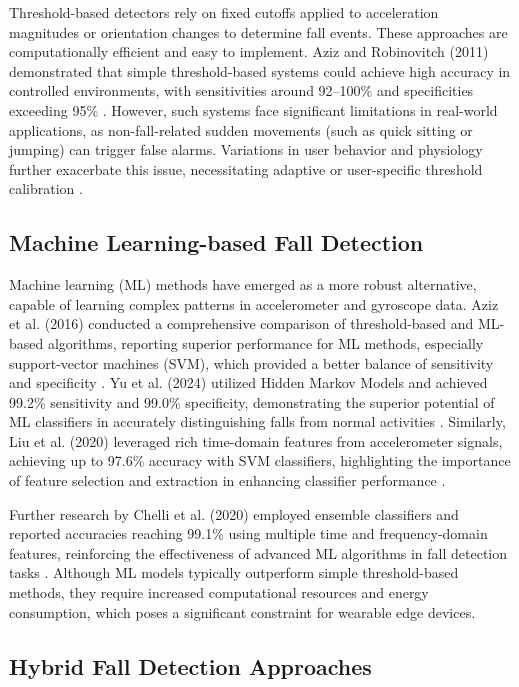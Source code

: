 \documentclass[conference]{IEEEtran}
\begin{document}
Threshold-based detectors rely on fixed cutoffs applied to acceleration magnitudes or orientation changes to determine fall events. These approaches are computationally efficient and easy to implement. Aziz and Robinovitch (2011) demonstrated that simple threshold-based systems could achieve high accuracy in controlled environments, with sensitivities around 92–100\% and specificities exceeding 95\% \cite{3}. However, such systems face significant limitations in real-world applications, as non-fall-related sudden movements (such as quick sitting or jumping) can trigger false alarms. Variations in user behavior and physiology further exacerbate this issue, necessitating adaptive or user-specific threshold calibration \cite{3,6}.

\subsection{Machine Learning-based Fall Detection}

Machine learning (ML) methods have emerged as a more robust alternative, capable of learning complex patterns in accelerometer and gyroscope data. Aziz et al. (2016) conducted a comprehensive comparison of threshold-based and ML-based algorithms, reporting superior performance for ML methods, especially support-vector machines (SVM), which provided a better balance of sensitivity and specificity \cite{6}. Yu et al. (2024) utilized Hidden Markov Models and achieved 99.2\% sensitivity and 99.0\% specificity, demonstrating the superior potential of ML classifiers in accurately distinguishing falls from normal activities \cite{5}. Similarly, Liu et al. (2020) leveraged rich time-domain features from accelerometer signals, achieving up to 97.6\% accuracy with SVM classifiers, highlighting the importance of feature selection and extraction in enhancing classifier performance \cite{7}.

Further research by Chelli et al. (2020) employed ensemble classifiers and reported accuracies reaching 99.1\% using multiple time and frequency-domain features, reinforcing the effectiveness of advanced ML algorithms in fall detection tasks \cite{7}. Although ML models typically outperform simple threshold-based methods, they require increased computational resources and energy consumption, which poses a significant constraint for wearable edge devices.

\subsection{Hybrid Fall Detection Approaches}
\end{document}
